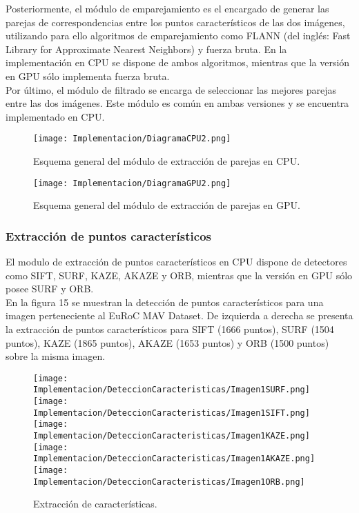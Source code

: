 Posteriormente, el módulo de emparejamiento es el encargado de generar las parejas de correspondencias entre los puntos característicos de las dos imágenes, utilizando para ello algoritmos de emparejamiento como FLANN (del inglés: Fast Library for Approximate Nearest Neighbors)
y fuerza bruta. En la implementación en CPU se dispone de ambos algoritmos, mientras que la versión en GPU sólo implementa fuerza bruta.\\

Por último, el módulo de filtrado se encarga de seleccionar las mejores parejas entre las dos imágenes.  Este módulo es común en ambas versiones y se encuentra implementado en CPU.\\

\begin{figure}[H]
	\centering
	\texttt{[image: Implementacion/DiagramaCPU2.png]}
	\caption{Esquema general del módulo de extracción de parejas en CPU.}
	\label{fig:my_label}
\end{figure}


\begin{figure}[H]
	\centering
	\texttt{[image: Implementacion/DiagramaGPU2.png]}
	\caption{Esquema general del módulo de extracción de parejas en GPU.}
	\label{fig:my_label}
\end{figure}

\subsubsection{Extracción de puntos característicos}

El modulo de extracción de puntos característicos en CPU dispone de detectores como SIFT, SURF, KAZE, AKAZE y ORB, mientras que la versión en GPU sólo posee SURF y ORB.\\

En la figura 15 se muestran la detección de puntos característicos  para una imagen perteneciente al EuRoC MAV Dataset. De izquierda a derecha se presenta la extracción de  puntos característicos para SIFT (1666 puntos), SURF (1504 puntos), KAZE (1865 puntos), AKAZE (1653 puntos) y ORB (1500 puntos) sobre la misma imagen. \\
\begin{figure}[H]
	
	\texttt{[image: Implementacion/DeteccionCaracteristicas/Imagen1SURF.png]}
	\texttt{[image: Implementacion/DeteccionCaracteristicas/Imagen1SIFT.png]}
	\texttt{[image: Implementacion/DeteccionCaracteristicas/Imagen1KAZE.png]}
	\texttt{[image: Implementacion/DeteccionCaracteristicas/Imagen1AKAZE.png]}
	\texttt{[image: Implementacion/DeteccionCaracteristicas/Imagen1ORB.png]}
	\caption{Extracción de características.}
	\label{fig:my_label}
\end{figure}


